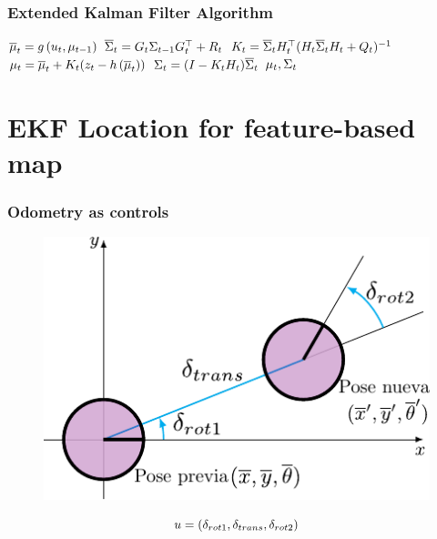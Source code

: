 \begin{frame}
    \frametitle{Extended Kalman Filter Algorithm}
   
    \begin{algorithmic}[1]
    \State $\overline{\mu}_{t} = g\left( u_{t}, \mu_{t-1} \right)$
    \State $\overline{\Sigma}_{t} = G_{t} \Sigma_{t-1} G_{t}^{\top}+R_{t}$
    \Statex
    \State $K_{t} = \overline{\Sigma}_{t} H_{t}^{\top} (H_{t} \overline{\Sigma}_{t} H_{t} + Q_{t})^{-1} $
    \State $\mu_{t} = \overline{\mu}_{t} + K_{t} (z_{t} - h\left( \overline{\mu}_{t} \right))$
    \State $\Sigma_{t} = (I - K_{t} H_{t}) \overline{\Sigma}_{t}$
    \State \Return $\mu_{t}, \Sigma_{t}$
    \EndProcedure
    \end{algorithmic}
   \end{frame}
   
   \section{EKF Location for feature-based map}
   
   \begin{frame}
    \frametitle{Odometry as controls}
   
    \begin{figure}[!h]
    \includegraphics[width=0.6\columnwidth]{./images/odometry_as_controls.pdf}
    \end{figure}
   
    \begin{equation*}
    u = (\delta _{rot1}, \delta _{trans}, \delta _{rot2})
    \end{equation*}
   
   \end{frame}
   
